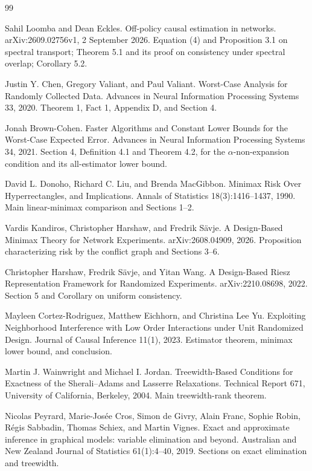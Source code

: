 \documentclass{article}
\begin{document}
\begin{thebibliography}{99}

   Sahil Loomba and Dean Eckles. Off-policy causal estimation in networks. arXiv:2609.02756v1, 2 September 2026. Equation (4) and Proposition 3.1 on spectral transport; Theorem 5.1 and its proof on consistency under spectral overlap; Corollary 5.2.

   Justin Y. Chen, Gregory Valiant, and Paul Valiant. Worst-Case Analysis for Randomly Collected Data. Advances in Neural Information Processing Systems 33, 2020. Theorem 1, Fact 1, Appendix D, and Section 4.

   Jonah Brown-Cohen. Faster Algorithms and Constant Lower Bounds for the Worst-Case Expected Error. Advances in Neural Information Processing Systems 34, 2021. Section 4, Definition 4.1 and Theorem 4.2, for the \(\alpha\)-non-expansion condition and its all-estimator lower bound.

   David L. Donoho, Richard C. Liu, and Brenda MacGibbon. Minimax Risk Over Hyperrectangles, and Implications. Annals of Statistics 18(3):1416--1437, 1990. Main linear-minimax comparison and Sections 1--2.

   Vardis Kandiros, Christopher Harshaw, and Fredrik Sävje. A Design-Based Minimax Theory for Network Experiments. arXiv:2608.04909, 2026. Proposition characterizing risk by the conflict graph and Sections 3--6.

   Christopher Harshaw, Fredrik Sävje, and Yitan Wang. A Design-Based Riesz Representation Framework for Randomized Experiments. arXiv:2210.08698, 2022. Section 5 and Corollary on uniform consistency.

   Mayleen Cortez-Rodriguez, Matthew Eichhorn, and Christina Lee Yu. Exploiting Neighborhood Interference with Low Order Interactions under Unit Randomized Design. Journal of Causal Inference 11(1), 2023. Estimator theorem, minimax lower bound, and conclusion.

   Martin J. Wainwright and Michael I. Jordan. Treewidth-Based Conditions for Exactness of the Sherali--Adams and Lasserre Relaxations. Technical Report 671, University of California, Berkeley, 2004. Main treewidth-rank theorem.

   Nicolas Peyrard, Marie-Josée Cros, Simon de Givry, Alain Franc, Sophie Robin, Régis Sabbadin, Thomas Schiex, and Martin Vignes. Exact and approximate inference in graphical models: variable elimination and beyond. Australian and New Zealand Journal of Statistics 61(1):4--40, 2019. Sections on exact elimination and treewidth.


\end{thebibliography}
\end{document}

